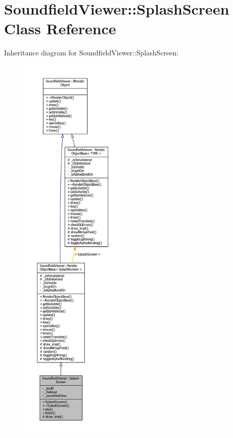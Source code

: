 \section{Soundfield\-Viewer\-:\-:Splash\-Screen Class Reference}
\label{classSoundfieldViewer_1_1SplashScreen}


Inheritance diagram for Soundfield\-Viewer\-:\-:Splash\-Screen\-:\nopagebreak
\begin{figure}[H]
\begin{center}
\leavevmode
\includegraphics[height=550pt]{d4/d0b/classSoundfieldViewer_1_1SplashScreen__inherit__graph}
\end{center}
\end{figure}


